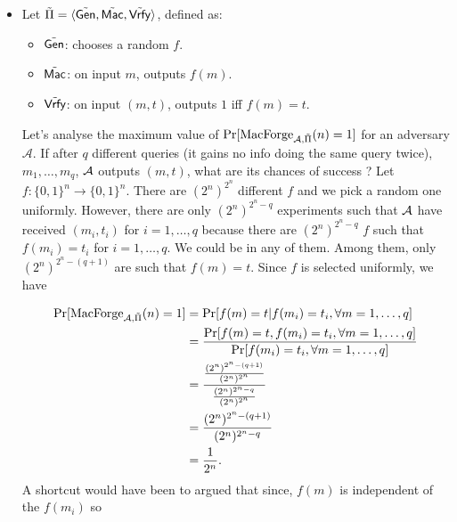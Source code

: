 \section{}
\subsection{}
\begin{solution}
  \begin{itemize}
    \item
      Let $\tilde{\Pi} = \langle \tilde{\operatorname{\mathsf{Gen}}}, \tilde{\operatorname{\mathsf{Mac}}}, \tilde{\operatorname{\mathsf{Vrfy}}} \rangle$, defined as:
      \begin{itemize}
        \item $\tilde{\operatorname{\mathsf{Gen}}}$: chooses a random $f$.
        \item $\tilde{\operatorname{\mathsf{Mac}}}$: on input $m$, outputs $f(m)$.
        \item $\tilde{\operatorname{\mathsf{Vrfy}}}$: on input $(m,t)$, outputs $1$ iff $f(m) = t$.
      \end{itemize}

      Let's analyse the maximum value of $\Pr[\operatorname{MacForge}_{\mathcal{A}, \tilde{\Pi}}(n) = 1]$ for an adversary $\mathcal{A}$.
      If after $q$ different queries (it gains no info doing the same query twice),
      $m_1, \ldots, m_q$, $\mathcal{A}$ outputs $(m, t)$, what are its chances of success ?
      Let $f:\{0,1\}^n \to \{0,1\}^n$.
      There are $(2^n)^{2^n}$ different $f$ and we pick a random one uniformly.
      However, there are only $(2^n)^{2^n-q}$ experiments such that $\mathcal{A}$ have received $(m_i,t_i)$ for $i = 1, \ldots, q$ because
      there are $(2^n)^{2^n-q}$ $f$ such that $f(m_i) = t_i$ for $i = 1, \ldots, q$.
      We could be in any of them.
      Among them, only $(2^n)^{2^n-(q+1)}$ are such that $f(m) = t$.
      Since $f$ is selected uniformly, we have

      \begin{align*}
        \Pr[\operatorname{MacForge}_{\mathcal{A}, \tilde{\Pi}}(n) = 1]
        & = \Pr[f(m) = t | f(m_i) = t_i, \forall m = 1, \ldots, q]\\
        & = \frac{\Pr[f(m) = t, f(m_i) = t_i, \forall m = 1, \ldots, q]}{\Pr[f(m_i) = t_i, \forall m = 1, \ldots, q]}\\
        & = \frac{\frac{(2^n)^{2^n-(q+1)}}{(2^n)^{2^n}}}{\frac{(2^n)^{2^n-q}}{(2^n)^{2^n}}}\\
        & = \frac{(2^n)^{2^n-(q+1)}}{(2^n)^{2^n-q}}\\
        & = \frac{1}{2^n}.
      \end{align*}
      A shortcut would have been to argued that since, $f(m)$ is independent of the $f(m_i)$ so


\end{itemize}
\end{solution}
